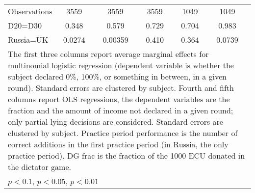\begin{tabular}{l|cccccc|cc|cc}
\hline
Observations    &     3559         &         &     3559         &         &     3559         &         &     1049         &         &     1049         &         \\
D20=D30         &    0.348         &         &    0.579         &         &    0.729         &         &    0.704         &         &    0.983         &         \\
Russia=UK       &   0.0274         &         &  0.00359         &         &    0.410         &         &    0.364         &         &   0.0739         &         \\
\hline\hline
\multicolumn{11}{p{18cm}}{\tiny The first three columns report average marginal effects for multinomial logistic regression (dependent variable is whether the subject declared 0\%,  100\%, or something in between, in a given round). Standard errors are clustered by subject. Fourth and fifth columns report OLS regressions, the dependent variables are the fraction and the amount of income not declared in a given round; only partial lying decisions are considered. Standard errors are clustered by subject. Practice period performance is the number of correct additions in the first practice period (in Russia, the only practice period). DG frac is the fraction of the 1000 ECU donated in the dictator game.}\\
\multicolumn{11}{l}{\tiny \sym{*} \(p<0.1\), \sym{**} \(p<0.05\), \sym{***} \(p<0.01\)}\\
\end{tabular}